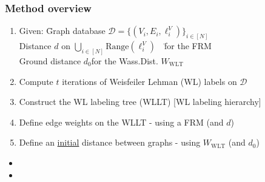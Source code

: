 \begin{frame}
\frametitle{Method overview} \vspace{-1cm}
	\begin{enumerate}
		\item \begin{tabbing}
			Given: \=Graph database $\mathcal{D}=\{ (V_i, E_i, \ell^V_i) \}_{i\in[N]}$\\
			\>Distance $d$ on $\bigcup_{i\in[N]}\text{Range}(\ell^V_i)$\ \ \=for the FRM\\
			\>Ground distance $d_0$\>for the Wass.Dist. $W_{\text{WLT}}$
		\end{tabbing}
		\item Compute $t$ iterations of Weisfeiler Lehman (WL) labels on $\mathcal{D}$
		\item Construct the WL labeling tree (WLLT) [WL labeling hierarchy]
		\item Define edge weights on the WLLT - using a FRM (and $d$)		
		\item Define an \underline{initial} distance between graphs - using $W_{\text{WLT}}$ (and $d_0$)
	\end{enumerate}
	\hfill\newline
	\begin{itemize}		
		\item[] \hfill\newline
		\item[] \hfill\newline
	\end{itemize}
\end{frame}

